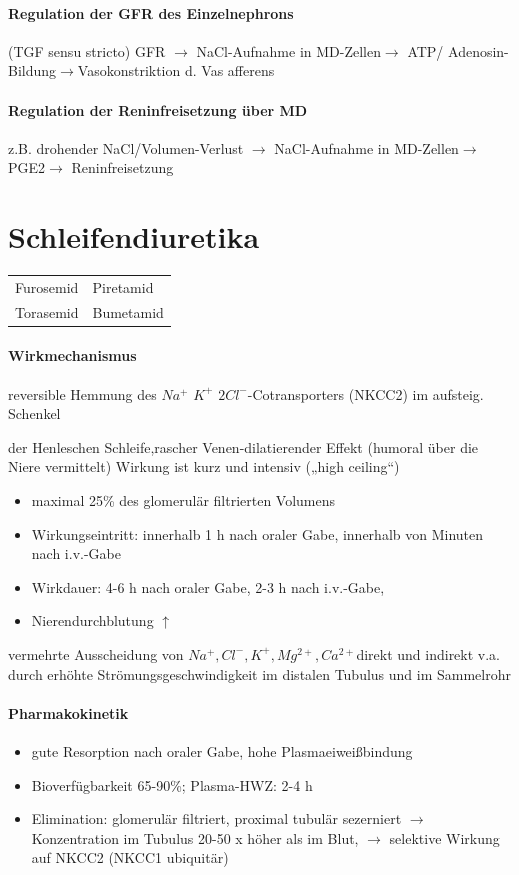 \documentclass[10pt,a4paper]{report}
\begin{document}
\paragraph{Regulation der GFR des Einzelnephrons} 
(TGF sensu stricto) GFR $\rightarrow$ NaCl-Aufnahme in MD-Zellen$\rightarrow$ ATP/ Adenosin-Bildung$\rightarrow$Vasokonstriktion d. Vas afferens
\paragraph{Regulation der Reninfreisetzung über MD} z.B. drohender 
NaCl/Volumen-Verlust $\rightarrow$ NaCl-Aufnahme in MD-Zellen$\rightarrow$ PGE2$\rightarrow$ Reninfreisetzung
\section{Schleifendiuretika}
\begin{tabularx}{\textwidth}{XX}
Furosemid&Piretamid\\ 	  
Torasemid&Bumetamid\\
\end{tabularx}
\paragraph{Wirkmechanismus}
reversible Hemmung des $Na^+$ $K^+$ $2Cl^-$-Cotransporters (NKCC2) im aufsteig. Schenkel 


der Henleschen Schleife,rascher Venen-dilatierender Effekt (humoral über die Niere vermittelt)	Wirkung ist kurz und intensiv („high ceiling“)
\begin{itemize}
	\item maximal 25\% des glomerulär filtrierten Volumens
	\item Wirkungseintritt: innerhalb 1 h nach oraler Gabe, innerhalb von Minuten nach i.v.-Gabe
	\item Wirkdauer:	4-6 h nach oraler Gabe, 2-3 h nach i.v.-Gabe, 
	\item Nierendurchblutung $\uparrow$
\end{itemize}
vermehrte Ausscheidung von $Na^+, Cl^-, K^+, Mg^{2+}, Ca^{2+}$direkt und indirekt v.a. durch erhöhte Strömungsgeschwindigkeit im distalen Tubulus und im Sammelrohr
\paragraph{Pharmakokinetik}
\begin{itemize}
	\item gute Resorption nach oraler Gabe, hohe Plasmaeiweißbindung
	\item Bioverfügbarkeit 65-90\%; Plasma-HWZ: 2-4 h
	\item Elimination:	glomerulär filtriert, proximal tubulär sezerniert $\rightarrow$ Konzentration im Tubulus 20-50 x höher als im Blut, $\rightarrow$ selektive Wirkung auf NKCC2 (NKCC1 ubiquitär)
\end{itemize}
\end{document}
